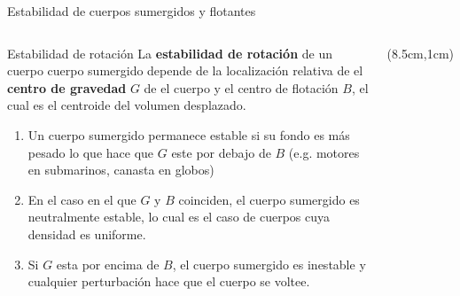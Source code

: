 \documentclass [xcolor=svgnames, t] {beamer}
\begin{document}
\begin{frame}{Estabilidad de cuerpos sumergidos y flotantes}
\small
\vspace{-0.8cm}
\begin{columns}
\begin{block}{Estabilidad de rotaci\'on}
La \textbf{estabilidad de rotaci\'on} de un cuerpo cuerpo sumergido depende de la localizaci\'on relativa de el \textbf{centro de gravedad} $G$ de el cuerpo y el centro de flotaci\'on $B$, el cual es el centroide del volumen desplazado. 
\begin{enumerate}
\item Un cuerpo sumergido permanece estable si su fondo es m\'as pesado lo que hace que $G$ este por debajo de $B$ (e.g. motores en submarinos, canasta en globos) 
\item En el caso en el que $G$ y $B$ coinciden, el cuerpo sumergido es neutralmente estable, lo cual es el caso de cuerpos cuya densidad es uniforme.
\item Si $G$ esta por encima de $B$, el cuerpo sumergido es inestable y cualquier perturbaci\'on hace que el cuerpo se voltee. 
\end{enumerate}
\end{block}
\begin{textblock*}{4cm}(8.5cm,1cm) %

\end{textblock*}
\end{columns}
\end{frame}
\end{document}
